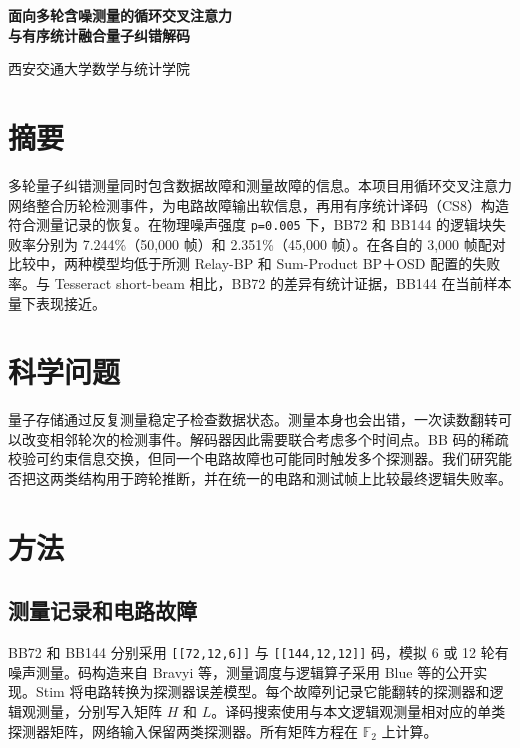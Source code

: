\documentclass[UTF8,a4paper,zihao=-4,fontset=fandol]{ctexart}
\begin{document}
\begin{center}
{\LARGE\bfseries 面向多轮含噪测量的循环交叉注意力\\[0.25em]与有序统计融合量子纠错解码}\par
\vspace{0.7em}{\large 钟路安}\par
西安交通大学数学与统计学院\par
\vspace{0.35em}{\small AI for Science 项目技术报告\quad 2026年11月26日}
\par{}
\end{center}
\vspace{0.5em}
\FloatBarrier\section*{摘要}

多轮量子纠错测量同时包含数据故障和测量故障的信息。本项目用循环交叉注意力网络整合历轮检测事件，为电路故障输出软信息，再用有序统计译码（CS8）构造符合测量记录的恢复。在物理噪声强度 \texttt{p=0.005} 下，BB72 和 BB144 的逻辑块失败率分别为 7.244\%（50,000 帧）和 2.351\%（45,000 帧）。在各自的 3,000 帧配对比较中，两种模型均低于所测 Relay-BP 和 Sum-Product BP＋OSD 配置的失败率。与 Tesseract short-beam 相比，BB72 的差异有统计证据，BB144 在当前样本量下表现接近。


\FloatBarrier\section{科学问题}

量子存储通过反复测量稳定子检查数据状态。测量本身也会出错，一次读数翻转可以改变相邻轮次的检测事件。解码器因此需要联合考虑多个时间点。BB 码的稀疏校验可约束信息交换，但同一个电路故障也可能同时触发多个探测器。我们研究能否把这两类结构用于跨轮推断，并在统一的电路和测试帧上比较最终逻辑失败率。


\FloatBarrier\section{方法}

\subsection{测量记录和电路故障}

BB72 和 BB144 分别采用 \texttt{[[72,12,6]]} 与 \texttt{[[144,12,12]]} 码，模拟 6 或 12 轮有噪声测量。码构造来自 Bravyi 等，测量调度与逻辑算子采用 Blue 等的公开实现。Stim 将电路转换为探测器误差模型。每个故障列记录它能翻转的探测器和逻辑观测量，分别写入矩阵 \(H\) 和 \(L\)。译码搜索使用与本文逻辑观测量相对应的单类探测器矩阵，网络输入保留两类探测器。所有矩阵方程在 \(\mathbb F_2\) 上计算。
\end{document}
